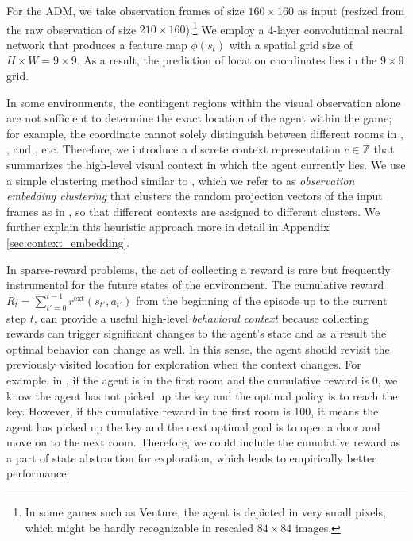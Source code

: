 \documentclass{article} \usepackage{iclr,times}
\begin{document}
{For the ADM,
we take observation frames of size $160 \times 160$ as input
(resized from the raw observation of size $210\times 160$).\footnote{In some games such as Venture, the agent is depicted in very small pixels,
    which might be hardly recognizable in rescaled $84 \times 84$ images.
}
We employ a 4-layer convolutional neural network that produces a feature map $\phi(s_t)$
with a spatial grid size of $H \times W = 9 \times 9$.
As a result, the prediction of location coordinates lies in the $9 \times 9$ grid.







In some environments, the contingent regions within the visual observation alone are not sufficient to determine the exact location of the agent within the game;
for example, the coordinate cannot solely distinguish between different rooms in
\Hero, \MontezumaRevenge, and \PrivateEye, etc.
Therefore, we introduce a discrete context representation $c \in \mathbb{Z}$ that summarizes the high-level visual context in which the agent currently lies.
We use a simple clustering method similar to \citep{Kulis:ICML2012:BNPCluster},
which we refer to as \emph{observation embedding clustering}
that clusters the random projection vectors of the input frames
as in \citep{Tang:NIPS2017:SimHash},
so that different contexts are assigned to different clusters.
We further explain this heuristic approach more in detail in Appendix \ref{sec:context_embedding}.












In sparse-reward problems, the act of collecting a reward is rare but frequently instrumental for the future states of the environment.
The cumulative reward  $R_t = \sum_{t'=0}^{t-1} r^\text{ext}(s_{t'}, a_{t'})$
from the beginning of the episode up to the current step $t$, can provide a useful high-level  \emph{behavioral context} because collecting rewards can trigger significant changes to the agent's state
and as a result the optimal behavior can change as well. In this sense, the agent should revisit the previously visited location for exploration when the context changes.
For example, in \MontezumaRevenge, if the agent is in the first room and the cumulative reward is 0, we know the agent has not picked up the key and the optimal policy is to reach the key.
However, if the cumulative reward in the first room is 100, it means the agent has picked up the key and the next optimal goal is to open a door and move on to the next room.
Therefore, we could include the cumulative reward as a part of state abstraction for exploration, which leads to empirically better performance.











}
\end{document}
